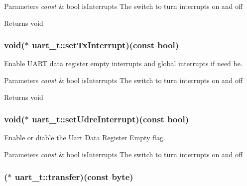 \begin{DoxyParams}{Parameters}
{\em const} & bool is\-Interrupts The switch to turn interrupts on and off \\
\hline
\end{DoxyParams}
\begin{DoxyReturn}{Returns}
void 
\end{DoxyReturn}
\hypertarget{a00018_ga2c0c4fa765ead8abb7d84dcf6f39dbc2}{
\subsubsection[{set\-Tx\-Interrupt}]{\setlength{\rightskip}{0pt plus 5cm}void($\ast$ uart\-\_\-t\-::set\-Tx\-Interrupt)(const bool)}}\label{a00018_ga2c0c4fa765ead8abb7d84dcf6f39dbc2}


Enable U\-A\-R\-T data register empty interrupts and global interrupts if need be. 


\begin{DoxyParams}{Parameters}
{\em const} & bool is\-Interrupts The switch to turn interrupts on and off \\
\hline
\end{DoxyParams}
\begin{DoxyReturn}{Returns}
void 
\end{DoxyReturn}
\hypertarget{a00018_gacfecb860e1dfd5b7bd9523fccb7e9f1e}{
\subsubsection[{set\-Udre\-Interrupt}]{\setlength{\rightskip}{0pt plus 5cm}void($\ast$ uart\-\_\-t\-::set\-Udre\-Interrupt)(const bool)}}\label{a00018_gacfecb860e1dfd5b7bd9523fccb7e9f1e}


Enable or diable the \hyperlink{a00009}{Uart} Data Register Empty flag. 


\begin{DoxyParams}{Parameters}
{\em const} & bool is\-Interrupts The switch to turn interrupts on and off \\
\hline
\end{DoxyParams}
\hypertarget{a00018_ga2c78990dd8babc3210665befa7ed7e4c}{
\subsubsection[{transfer}]{($\ast$ uart\-\_\-t\-::transfer)(const {\bf byte})}}\label{a00018_ga2c78990dd8babc3210665befa7ed7e4c}


